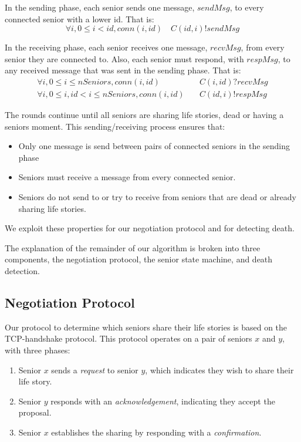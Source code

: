\documentclass[12pt,a4paper]{scrartcl}
\begin{document}
In the sending phase, each senior sends one message, $sendMsg$, to every connected senior with a lower id.
That is:
\begin{equation}
    \forall i, 0 \le i < id, conn(i, id) \quad C(id,i)!sendMsg
\label{eq:send-phase}
\end{equation}

In the receiving phase, each senior receives one message, $recvMsg$, from every senior they are connected to.
Also, each senior must respond, with $respMsg$, to any received message that was sent in the sending phase.
That is:
\begin{align}
    \forall i, 0 \le i \le nSeniors, conn(i, id) &\quad C(i,id)?recvMsg \\
    \forall i, 0 \le i, id < i \le nSeniors, conn(i, id) &\quad C(id,i)!respMsg
\label{eq:recv-phase}
\end{align}

The rounds continue until all seniors are sharing life stories, dead or having a seniors moment.
This sending/receiving process ensures that:
\begin{itemize}
    \item Only one message is send between pairs of connected seniors in the sending phase
    \item Seniors must receive a message from every connected senior.
    \item Seniors do not send to or try to receive from seniors that are dead or already sharing life stories.
\end{itemize}
We exploit these properties for our negotiation protocol and for detecting death.

The explanation of the remainder of our algorithm is broken into three components, the negotiation protocol, the senior state machine, and death detection.

\subsection{Negotiation Protocol}
Our protocol to determine which seniors share their life stories is based on the TCP-handshake protocol.
This protocol operates on a pair of seniors $x$ and $y$, with three phases:
\begin{enumerate}
    \item Senior $x$ sends a \emph{request} to senior $y$, which indicates they wish to share their life story.
    \item Senior $y$ responds with an \emph{acknowledgement}, indicating they accept the proposal.
    \item Senior $x$ establishes the sharing by responding with a \emph{confirmation}.
\end{enumerate}
\end{document}
